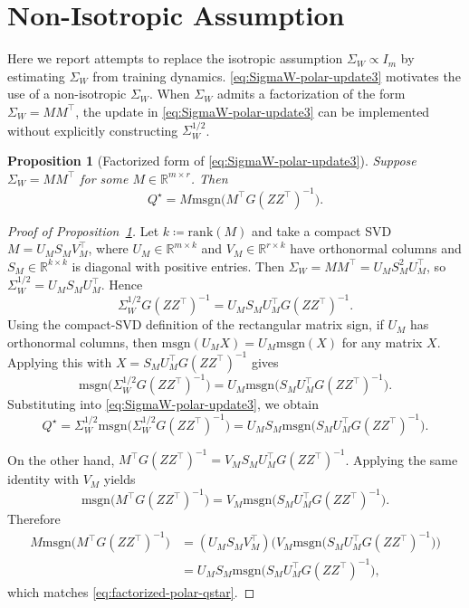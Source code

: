 \documentclass[11pt]{article}
\newtheorem{proposition}{Proposition}
\begin{document}
\section{Non-Isotropic Assumption}
\label{app:llm-exp-sigmaW}

Here we report attempts to replace the isotropic assumption $\Sigma_W \propto I_m$ by estimating $\Sigma_W$ from training dynamics. \eqref{eq:SigmaW-polar-update3} motivates the use of a non-isotropic ${\Sigma}_{W}$. When ${\Sigma}_{W}$ admits a factorization of the form ${\Sigma}_{W} = MM^\top$, the update in \eqref{eq:SigmaW-polar-update3} can be implemented without explicitly constructing $\Sigma_W^{1/2}$.

\begin{proposition}[Factorized form of \eqref{eq:SigmaW-polar-update3}]
\label{prop:factorized-polar-SigmaW}
Suppose ${\Sigma}_{{W}}={M}{M}^\top$ for some ${M}\in\mathbb{R}^{m\times r}$. Then
\[
{Q}^\star
=
{M} \mathrm{msgn}\Big({M}^\top {G}({Z}{Z}^\top)^{-1}\Big).
\]
\end{proposition}

\begin{proof}[Proof of Proposition~\ref{prop:factorized-polar-SigmaW}]
Let $k\coloneqq\mathrm{rank}(M)$ and take a compact SVD $M=U_M S_M V_M^\top$, where $U_M\in\mathbb{R}^{m\times k}$ and $V_M\in\mathbb{R}^{r\times k}$ have orthonormal columns and $S_M\in\mathbb{R}^{k\times k}$ is diagonal with positive entries. Then $\Sigma_W=MM^\top=U_M S_M^2 U_M^\top$, so $\Sigma_W^{1/2}=U_M S_M U_M^\top$.
Hence
\[
\Sigma_W^{1/2}G(ZZ^\top)^{-1}
=
U_M S_M U_M^\top G(ZZ^\top)^{-1}.
\]
Using the compact-SVD definition of the rectangular matrix sign, if $U_M$ has orthonormal columns, then $\mathrm{msgn}(U_M X)=U_M\mathrm{msgn}(X)$ for any matrix $X$. Applying this with $X=S_M U_M^\top G(ZZ^\top)^{-1}$ gives
\[
\mathrm{msgn}\Big(\Sigma_W^{1/2}G(ZZ^\top)^{-1}\Big)
=
U_M \mathrm{msgn}\Big(S_M U_M^\top G(ZZ^\top)^{-1}\Big).
\]
Substituting into \eqref{eq:SigmaW-polar-update3}, we obtain
\begin{equation}
\label{eq:factorized-polar-qstar}
Q^\star
=
\Sigma_W^{1/2}
\mathrm{msgn}\Big(\Sigma_W^{1/2}G(ZZ^\top)^{-1}\Big)
=
U_M S_M
\mathrm{msgn}\Big(S_M U_M^\top G(ZZ^\top)^{-1}\Big).
\end{equation}

On the other hand, $M^\top G(ZZ^\top)^{-1}=V_M S_M U_M^\top G(ZZ^\top)^{-1}$. Applying the same identity with $V_M$ yields
\[
\mathrm{msgn}\Big(M^\top G(ZZ^\top)^{-1}\Big)
=
V_M \mathrm{msgn}\Big(S_M U_M^\top G(ZZ^\top)^{-1}\Big).
\]
Therefore
\begin{align*}
M \mathrm{msgn}\Big(M^\top G(ZZ^\top)^{-1}\Big)
&= 
(U_M S_M V_M^\top)\Big(V_M \mathrm{msgn}\big(S_M U_M^\top G(ZZ^\top)^{-1}\big)\Big) \\
&= 
U_M S_M \mathrm{msgn}\Big(S_M U_M^\top G(ZZ^\top)^{-1}\Big),
\end{align*}
which matches \eqref{eq:factorized-polar-qstar}.
\end{proof}
\end{document}
